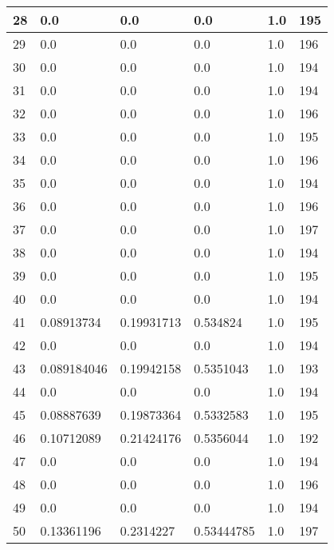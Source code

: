 \begin{longtable}{|l|l|l|l|l|l|}
28 & 0.0 & 0.0 & 0.0 & 1.0 & 195 \\ \hline 
29 & 0.0 & 0.0 & 0.0 & 1.0 & 196 \\ \hline 
30 & 0.0 & 0.0 & 0.0 & 1.0 & 194 \\ \hline 
31 & 0.0 & 0.0 & 0.0 & 1.0 & 194 \\ \hline 
32 & 0.0 & 0.0 & 0.0 & 1.0 & 196 \\ \hline 
33 & 0.0 & 0.0 & 0.0 & 1.0 & 195 \\ \hline 
34 & 0.0 & 0.0 & 0.0 & 1.0 & 196 \\ \hline 
35 & 0.0 & 0.0 & 0.0 & 1.0 & 194 \\ \hline 
36 & 0.0 & 0.0 & 0.0 & 1.0 & 196 \\ \hline 
37 & 0.0 & 0.0 & 0.0 & 1.0 & 197 \\ \hline 
38 & 0.0 & 0.0 & 0.0 & 1.0 & 194 \\ \hline 
39 & 0.0 & 0.0 & 0.0 & 1.0 & 195 \\ \hline 
40 & 0.0 & 0.0 & 0.0 & 1.0 & 194 \\ \hline 
41 & 0.08913734 & 0.19931713 & 0.534824 & 1.0 & 195 \\ \hline 
42 & 0.0 & 0.0 & 0.0 & 1.0 & 194 \\ \hline 
43 & 0.089184046 & 0.19942158 & 0.5351043 & 1.0 & 193 \\ \hline 
44 & 0.0 & 0.0 & 0.0 & 1.0 & 194 \\ \hline 
45 & 0.08887639 & 0.19873364 & 0.5332583 & 1.0 & 195 \\ \hline 
46 & 0.10712089 & 0.21424176 & 0.5356044 & 1.0 & 192 \\ \hline 
47 & 0.0 & 0.0 & 0.0 & 1.0 & 194 \\ \hline 
48 & 0.0 & 0.0 & 0.0 & 1.0 & 196 \\ \hline 
49 & 0.0 & 0.0 & 0.0 & 1.0 & 194 \\ \hline 
50 & 0.13361196 & 0.2314227 & 0.53444785 & 1.0 & 197 \\ \hline 
\end{longtable}